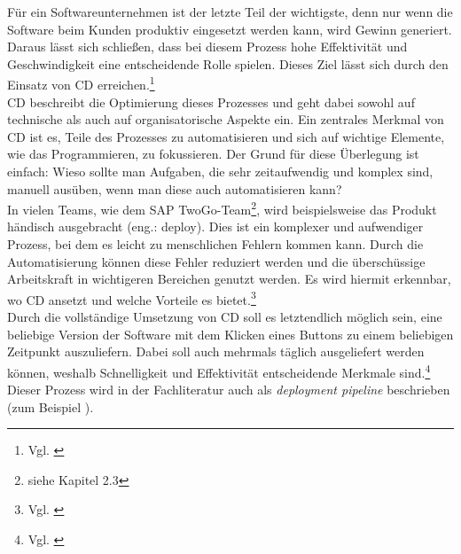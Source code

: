 Für ein Softwareunternehmen ist der letzte Teil der wichtigste, denn nur wenn die Software beim Kunden produktiv eingesetzt werden kann, wird Gewinn generiert. Daraus lässt sich schließen, dass bei diesem Prozess hohe Effektivität und Geschwindigkeit  eine  entscheidende  Rolle spielen. Dieses Ziel lässt sich durch den Einsatz von \acs{CD} erreichen.\footnote{Vgl. \cite[Kapitel 1]{swartout_continuous_2012}}\\
\acs{CD} beschreibt die Optimierung dieses Prozesses und geht dabei sowohl auf technische als auch auf organisatorische Aspekte ein. Ein zentrales Merkmal von \acs{CD} ist es, Teile des Prozesses zu automatisieren und sich auf wichtige Elemente, wie das Programmieren, zu fokussieren. Der Grund für diese Überlegung ist einfach: Wieso sollte man Aufgaben, die sehr zeitaufwendig und komplex sind, manuell ausüben, wenn man diese auch automatisieren kann? \\ In vielen Teams, wie dem SAP TwoGo-Team\footnote{siehe Kapitel 2.3}, wird beispielsweise das Produkt händisch ausgebracht (eng.: deploy). Dies ist ein komplexer und aufwendiger Prozess, bei dem es leicht zu menschlichen Fehlern kommen kann. Durch die Automatisierung können diese Fehler reduziert werden und die überschüssige Arbeitskraft in wichtigeren Bereichen genutzt werden. Es wird hiermit erkennbar, wo \acs{CD} ansetzt und welche Vorteile es bietet.\footnote{Vgl. \cite[Seite 3ff]{continuous_dev}} \\
Durch die vollständige Umsetzung von \acs{CD} soll es  letztendlich möglich sein, eine beliebige Version der Software mit dem Klicken eines Buttons zu einem beliebigen Zeitpunkt auszuliefern. Dabei soll auch mehrmals täglich ausgeliefert werden können, weshalb Schnelligkeit und Effektivität entscheidende Merkmale sind.\footnote{Vgl. \cite[Seite 5]{continuous_dev}} Dieser Prozess wird in der Fachliteratur   auch als \textit{deployment pipeline} beschrieben (zum Beispiel \cite{continuous_dev}).\\

